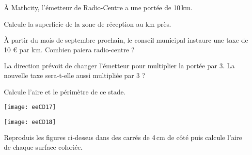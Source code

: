 \begin{exercice}[]
À Mathcity, l'émetteur de \og Radio-Centre \fg a une portée de 10\,km.


\begin{colenumerate}{1} 
\item Calcule la superficie de la zone de réception au km près.
\item À partir du mois de septembre prochain, le conseil municipal instaure une taxe de 10 € par km. Combien paiera \og radio-centre \fg ?
\item La direction prévoit de changer l'émetteur pour multiplier la portée par 3. La nouvelle taxe sera-t-elle aussi multipliée par 3 ? 
\end{colenumerate} 
\end{exercice}

\begin{exercice}[]
Calcule l'aire et le périmètre de ce stade.
\begin{center}
    \texttt{[image: eeCD17]}
\end{center}

\end{exercice}

\begin{exercice}[Quadrillage]

\begin{center}
    \texttt{[image: eeCD18]}
\end{center}

Reproduis les figures ci-dessus dans des carrés de 4\,cm de côté puis calcule l'aire de chaque surface coloriée.
\end{exercice}
